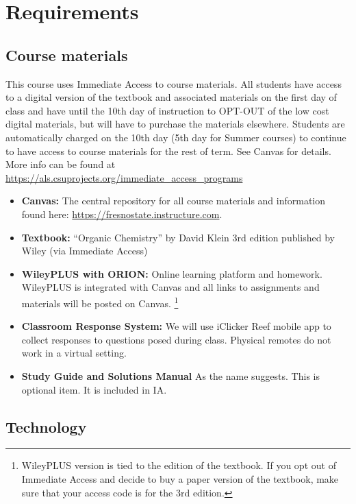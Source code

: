 \hypertarget{requirements}{%
\section{Requirements}\label{requirements}}

\hypertarget{course-materials}{%
\subsection{Course materials}\label{course-materials}}

This course uses Immediate Access to course materials. All students have
access to a digital version of the textbook and associated materials on
the first day of class and have until the 10th day of instruction to
OPT-OUT of the low cost digital materials, but will have to purchase the
materials elsewhere. Students are automatically charged on the 10th day
(5th day for Summer courses) to continue to have access to course
materials for the rest of term. See Canvas for details. More info can be
found at \url{https://als.csuprojects.org/immediate_access_programs}

\begin{itemize}
\tightlist
\item
  \textbf{Canvas:} The central repository for all course materials and
  information found here: \url{https://fresnostate.instructure.com}.
\item
  \textbf{Textbook:} ``Organic Chemistry'' by David Klein 3rd edition
  published by Wiley (via Immediate Access)
\item
  \textbf{WileyPLUS with ORION:} Online learning platform and homework.
  WileyPLUS is integrated with Canvas and all links to assignments and
  materials will be posted on Canvas. \footnote{WileyPLUS version is
    tied to the edition of the textbook. If you opt out of Immediate
    Access and decide to buy a paper version of the textbook, make sure
    that your access code is for the 3rd edition.}
\item
  \textbf{Classroom Response System:} We will use iClicker Reef mobile
  app to collect responses to questions posed during class. Physical
  remotes do not work in a virtual setting.
\item
  \textbf{Study Guide and Solutions Manual} As the name suggests. This
  is optional item. It is included in IA.
\end{itemize}

\hypertarget{technology}{%
\subsection{Technology}\label{technology}}

